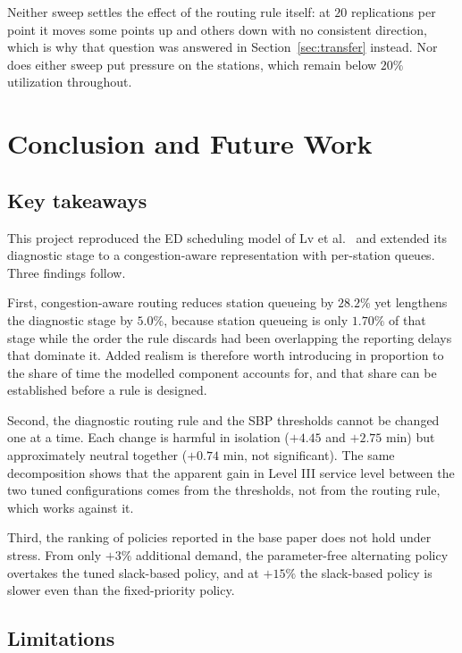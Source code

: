 \documentclass[sigconf]{acmart}
\begin{document}
Neither sweep settles the effect of the routing rule itself: at $20$
replications per point it moves some points up and others down with no
consistent direction, which is why that question was answered in
Section~\ref{sec:transfer} instead. Nor does either sweep put pressure on the
stations, which remain below $20\%$ utilization throughout.


\section{Conclusion and Future Work}
\label{sec:conclusion}

\subsection{Key takeaways}

This project reproduced the ED scheduling model of Lv et al.~\cite{lv2026des}
and extended its diagnostic stage to a congestion-aware representation with
per-station queues. Three findings follow.

First, congestion-aware routing reduces station queueing by $28.2\%$ yet
lengthens the diagnostic stage by $5.0\%$, because station queueing is only
$1.70\%$ of that stage while the order the rule discards had been overlapping
the reporting delays that dominate it. Added realism is therefore worth
introducing in proportion to the share of time the modelled component accounts
for, and that share can be established before a rule is designed.

Second, the diagnostic routing rule and the SBP thresholds cannot be changed
one at a time. Each change is harmful in isolation ($+4.45$ and $+2.75$ min)
but approximately neutral together ($+0.74$ min, not significant). The same
decomposition shows that the apparent gain in Level III service level between
the two tuned configurations comes from the thresholds, not from the routing
rule, which works against it.

Third, the ranking of policies reported in the base paper does not hold under
stress. From only $+3\%$ additional demand, the parameter-free alternating
policy overtakes the tuned slack-based policy, and at $+15\%$ the slack-based
policy is slower even than the fixed-priority policy.

\subsection{Limitations}
\end{document}
